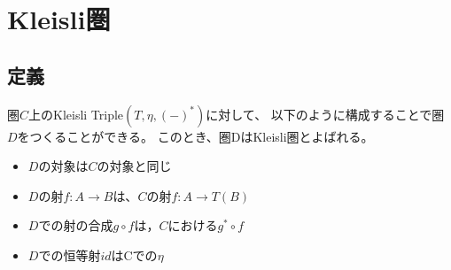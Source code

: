 

\newpage
\section{Kleisli圏}

\subsection{定義}
圏$C$上のKleisli Triple$(T, \eta, (-)^*)$に対して、
以下のように構成することで圏$D$をつくることができる。
このとき、圏DはKleisli圏とよばれる。

\begin{itemize}
    \item $D$の対象は$C$の対象と同じ
    \item $D$の射$f:A\to B$は、$C$の射$f:A\to T(B)$
    \item $D$での射の合成$g\circ f$は，$C$における$g^*\circ f$
    \item $D$での恒等射$id$はCでの$\eta$
\end{itemize}
